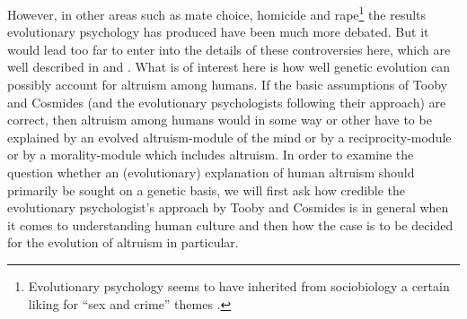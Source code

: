 However, in other areas such as mate
choice, homicide and rape\footnote{Evolutionary psychology seems to have
  inherited from sociobiology a certain liking for ``sex and crime'' themes
  \cite[p.\  44ff.]{dupre:1993}.} the results evolutionary psychology has
produced have been much more debated. But it would lead too far to enter into
the details of these controversies here, which are well described in \cite[p.\ 
48ff.]{dupre:2001} and \cite[p.\ 170ff.]{laland-brown:2004}. What is of
interest here is how well genetic evolution can possibly account for altruism
among humans.  If the basic assumptions of Tooby and Cosmides (and the
evolutionary psychologists following their approach) are correct, then
altruism among humans would in some way or other have to be explained by an
evolved altruism-module of the mind or by a reciprocity-module or by a
morality-module which includes altruism. In order to examine the question
whether an (evolutionary) explanation of human altruism should primarily be
sought on a genetic basis, we will first ask how credible the evolutionary
psychologist's approach by Tooby and Cosmides is in general when it comes to
understanding human culture and then how the case is to be decided for the
evolution of altruism in particular.

